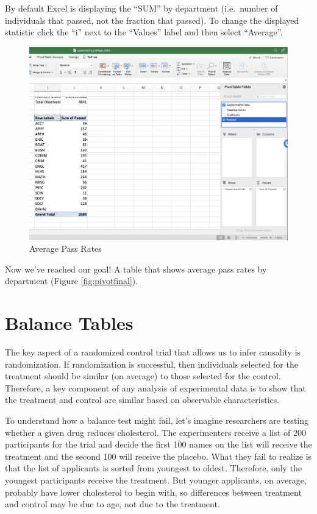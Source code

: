 \documentclass[
]{book}
\begin{document}
By default Excel is displaying the ``SUM'' by department (i.e.~number of individuals that passed, not the fraction that passed). To change the displayed statistic click the ``i'' next to the ``Values'' label and then select ``Average''.

\begin{figure}

{\centering \includegraphics[width=1\linewidth]{images/01_pivot7} 

}

\caption{Average Pass Rates}\label{fig:pivot8}
\end{figure}

Now we've reached our goal! A table that shows average pass rates by department (Figure \ref{fig:pivotfinal}).

\hypertarget{balance-tables}{%
\section{Balance Tables}\label{balance-tables}}

The key aspect of a randomized control trial that allows us to infer causality is randomization. If randomization is successful, then individuals selected for the treatment should be similar (on average) to those selected for the control. Therefore, a key component of any analysis of experimental data is to show that the treatment and control are similar based on observable characteristics.

To understand how a balance test might fail, let's imagine researchers are testing whether a given drug reduces cholesterol. The experimenters receive a list of 200 participants for the trial and decide the first 100 names on the list will receive the treatment and the second 100 will receive the placebo. What they fail to realize is that the list of applicants is sorted from youngest to oldest. Therefore, only the youngest participants receive the treatment. But younger applicants, on average, probably have lower cholesterol to begin with, so differences between treatment and control may be due to age, not due to the treatment.
\end{document}

